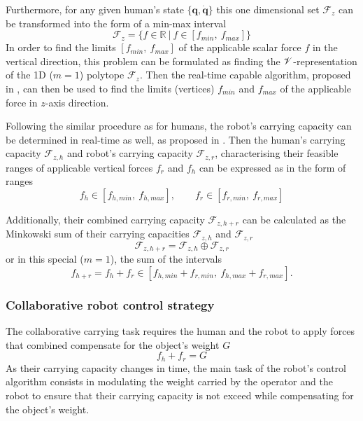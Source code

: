 Furthermore, for any given human's state $\{\bm{q},\dot{\bm{q}}\}$ this one dimensional set $\mathcal{F}_z$ can be transformed into the form of a min-max interval
\begin{equation}
    \mathcal{F}_z = \{ f \in \mathbb{R} ~|~ f \in[{f}_{min}, ~{f}_{max}]\}
\end{equation}
In order to find the limits $[f_{min},~f_{max}]$ of the applicable scalar force $f$ in the vertical direction, this problem can be formulated as finding the $\mathscr{V}$-representation of the 1D ($m=1$) polytope $\mathcal{F}_z$. Then the real-time capable algorithm, proposed in , can then be used to find the limits (vertices) $f_{min}$ and $f_{max}$ of the applicable force in $z$-axis direction.  

Following the similar procedure as for humans, the robot's carrying capacity can be determined in real-time as well, as proposed in . Then the human's carrying capacity $\mathcal{F}_{z,h}$ and robot's carrying capacity $\mathcal{F}_{z,r}$, characterising their feasible ranges of applicable vertical forces $f_r$ and $f_h$ can be expressed as in the form of ranges
\begin{equation}
    f_{h}\in [f_{h,min}, ~f_{h,max}], \qquad f_{r} \in [f_{r,min}, ~f_{r,max} ]
    \label{eq:human_robot_carrying_capacity}
\end{equation}

Additionally, their combined carrying capacity $\mathcal{F}_{z,h+r}$ can be calculated as the Minkowski sum of their carrying capacities $\mathcal{F}_{z,h}$ and $\mathcal{F}_{z,r}$ 
$$\mathcal{F}_{z,h+r} = \mathcal{F}_{z,h}\oplus \mathcal{F}_{z,r}$$
or in this special ($m=1$), the sum of the intervals 
$$f_{h+r} = f_{h}+f_{r} \in  [f_{h,min} + f_{r,min}, ~f_{h,max} + f_{r,max}].$$

\subsubsection{Collaborative robot control strategy}
\label{sec:collab_robot_control_human_robot}

The collaborative carrying task requires the human and the robot to apply forces that combined compensate for the object's weight $G$ 
$$f_{h} + f_{r} = G$$
As their carrying capacity changes in time, the main task of the robot's control algorithm consists in modulating the weight carried by the operator and the robot to ensure that their carrying capacity is not exceed while compensating for the object's weight.

